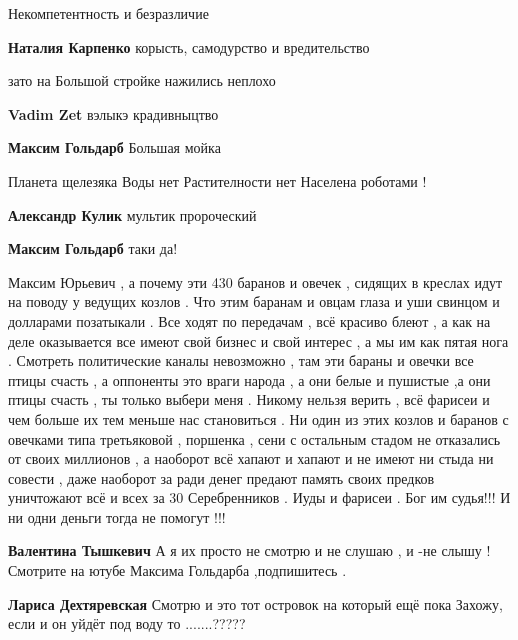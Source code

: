 \begin{itemize}

Некомпетентность и безразличие

\textbf{Наталия Карпенко} корысть, самодурство и вредительство


зато на Большой стройке нажились неплохо

\begin{itemize} %
\textbf{Vadim Zet} вэлыкэ крадивныцтво

\textbf{Максим Гольдарб} Большая мойка
\end{itemize} %

Планета щелезяка
Воды нет
Растителности нет
Населена роботами !

\begin{itemize} %
\textbf{Александр Кулик} мультик пророческий

\textbf{Максим Гольдарб} таки да!
\end{itemize} %


Максим Юрьевич , а почему эти 430 баранов и овечек , сидящих в креслах идут на
поводу у ведущих козлов . Что этим баранам и овцам глаза и уши свинцом и
долларами позатыкали . Все ходят по передачам , всё красиво блеют , а как на
деле оказывается все имеют свой бизнес и свой интерес , а мы им как пятая нога
. Смотреть политические каналы невозможно , там эти бараны и овечки все птицы
счасть , а оппоненты это враги народа , а они белые и пушистые ,а они птицы
счасть , ты только выбери меня . Никому нельзя верить , всё фарисеи и чем
больше их тем меньше нас становиться . Ни один из этих козлов и баранов с
овечками типа третьяковой , поршенка , сени с остальным стадом не отказались от
своих миллионов , а наоборот всё хапают и хапают и не имеют ни стыда ни совести
, даже наоборот за ради денег предают память своих предков уничтожают всё и
всех за 30 Серебренников . Иуды и фарисеи . Бог им судья!!! И ни одни деньги
тогда не помогут !!!

\begin{itemize} %
\textbf{Валентина Тышкевич} А я их просто не смотрю и не слушаю , и -не слышу ! Смотрите на ютубе Максима Гольдарба ,подпишитесь .

\textbf{Лариса Дехтяревская} Смотрю и это тот островок на который ещё пока Захожу, если и он уйдёт под воду то .......?????


\end{itemize}
\end{itemize}
